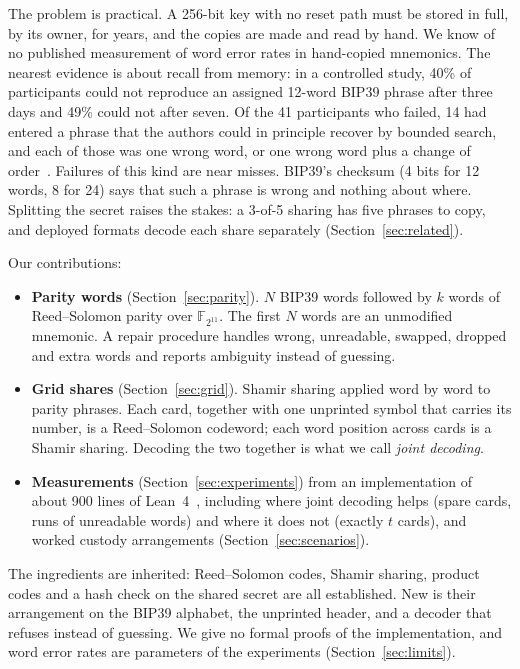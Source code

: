 \documentclass[numeric]{anvil-paper}
\newcommand{\F}{\mathbb{F}}
\begin{document}
The problem is practical. A 256-bit key with no reset path must be stored in
full, by its owner, for years, and the copies are made and read by hand. We
know of no published measurement of word error rates in hand-copied mnemonics.
The nearest evidence is about recall from memory: in a controlled study, 40\%
of participants could not reproduce an assigned 12-word BIP39 phrase after
three days and 49\% could not after seven. Of the 41 participants who failed,
14 had entered a phrase that the authors could in principle recover by bounded
search, and each of those was one wrong word, or one wrong word plus a change
of order~\citep{ambati2026notall}. Failures of
this kind are near misses. BIP39's checksum (4 bits for 12 words, 8 for 24)
says that such a phrase is wrong and nothing about where. Splitting the secret
raises the stakes: a 3-of-5 sharing has five phrases to copy, and deployed
formats decode each share separately (Section~\ref{sec:related}).

Our contributions:
\begin{itemize}
\item \textbf{Parity words} (Section~\ref{sec:parity}). $N$ BIP39 words
  followed by $k$ words of Reed--Solomon parity over $\F_{2^{11}}$. The first
  $N$ words are an unmodified mnemonic. A repair procedure handles wrong,
  unreadable, swapped, dropped and extra words and reports ambiguity instead
  of guessing.
\item \textbf{Grid shares} (Section~\ref{sec:grid}). Shamir sharing applied word
  by word to parity phrases. Each card, together with one unprinted symbol
  that carries its number, is a Reed--Solomon codeword; each word position
  across cards is a Shamir sharing. Decoding the two together is what we call
  \emph{joint decoding}.
\item \textbf{Measurements} (Section~\ref{sec:experiments}) from an
  implementation of about 900 lines of Lean~4~\citep{moura2021lean}, including
  where joint decoding helps (spare cards, runs of unreadable words) and where
  it does not (exactly $t$ cards), and worked custody arrangements
  (Section~\ref{sec:scenarios}).
\end{itemize}
The ingredients are inherited: Reed--Solomon codes, Shamir sharing, product
codes and a hash check on the shared secret are all established. New is their
arrangement on the BIP39 alphabet, the unprinted header, and a decoder that
refuses instead of guessing. We give no formal proofs of the implementation,
and word error rates are parameters of the experiments
(Section~\ref{sec:limits}).
\end{document}
